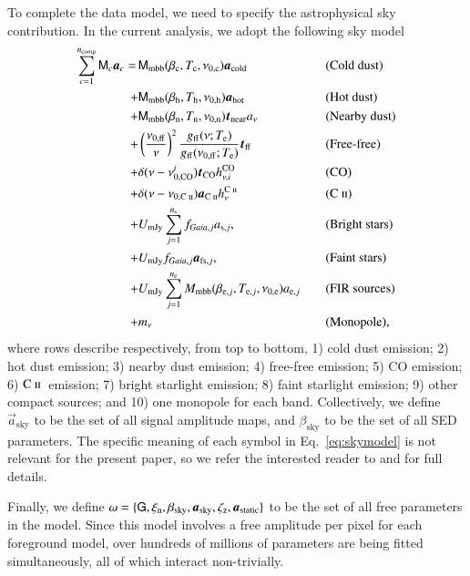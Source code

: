 \documentclass{aa}
\newcommand{\cii}{\ensuremath{\mathsc {C\ ii}}}
\renewcommand{\t}[0]{\vec{t}}
\newcommand{\G}[0]{\tens{G}}
\renewcommand{\a}[0]{\vec{a}}
\newcommand{\M}[0]{\tens{M}}
\newcommand{\Te}[0]{T_{\rm e}}
\newcommand{\mathsc}[1]{{\normalfont\textsc{#1}}}
\def\Tcold{\ifmmode T_\mathrm{c}\else $T_{\mathrm{c}}$\fi}
\def\Thot{\ifmmode T_\mathrm{h}\else $T_{\mathrm{h}}$\fi}
\def\Tnear{\ifmmode T_\mathrm{n}\else $T_{\mathrm{n}}$\fi}
\def\bcold{\ifmmode \beta_\mathrm{c}\else $\beta_{\mathrm{c}}$\fi}
\def\bhot{\ifmmode \beta_\mathrm{h}\else $\beta_{\mathrm{h}}$\fi}
\def\bnear{\ifmmode \beta_\mathrm{n}\else $\beta_{\mathrm{n}}$\fi}
\def\nuzeroff{\ifmmode \nu_{0,\mathrm{ff}}\else $\nu_{0,\mathrm{ff}}$\fi}
\def\nuzerocold{\ifmmode \nu_{0,\mathrm{c}}\else $\nu_{0,\mathrm{c}}$\fi}
\def\nuzerohot{\ifmmode \nu_{0,\mathrm{h}}\else $\nu_{0,\mathrm{h}}$\fi}
\def\nuzeronear{\ifmmode \nu_{0,\mathrm{n}}\else $\nu_{0,\mathrm{n}}$\fi}
\def\Te{\ifmmode T_{\mathrm{e}}\else $T_{\mathrm{e}}$\fi}
\begin{document}
To complete the data model, we need to specify the astrophysical sky
contribution. In the current analysis, we adopt the following sky model
\begin{alignat}{4}
  \sum_{c=1}^{n_{\mathrm{comp}}} \M_c \a_c  = \,
  &\M_{\mathrm{mbb}}(\bcold,\Tcold,\nuzerocold)\vec{a}_{\mathrm{cold}}
  && \textrm{(Cold dust)}\label{eq:skymodel}\\
  + &\M_{\mathrm{mbb}}(\bhot,\Thot,\nuzerohot)
  \vec{a}_{\mathrm{hot}} && \textrm{(Hot dust)}\nonumber \\
  + &\M_{\mathrm{mbb}}(\bnear,\Tnear,\nuzeronear) \t_{\mathrm{near}}
  a_{\nu} && \textrm{(Nearby dust)} \nonumber \\
  + &\left(\frac{\nuzeroff}{\nu}\right)^2
  \frac{g_{\mathrm{ff}}(\nu;\Te) }{g_{\mathrm{ff}}(\nuzeroff;\Te)}
  \vec{t}_{\mathrm{ff}} && \textrm{(Free-free)} \nonumber\\
  + &\delta(\nu-\nu_{0,\mathrm{CO}}^i) \t_{\mathrm{CO}}
  h^{\mathrm{CO}}_{\nu,i} && \textrm{(CO)}\nonumber\\
  + &\delta(\nu-\nu_{0,\cii}) \a_{\cii}
	h^{\cii}_{\nu} && (\cii)\nonumber \\
  + &U_{\mathrm{mJy}} \sum_{j=1}^{n_{\mathrm{s}}}
  f_{\mathit{Gaia},j} a_{\mathrm{s},j}, &\quad&
  \textrm{(Bright stars)} \nonumber\\
  + &U_{\mathrm{mJy}} f_{\mathit{Gaia},j} \a_{\mathrm{fs},j}, &\quad&
  \textrm{(Faint stars)} \nonumber\\  
    + &U_{\mathrm{mJy}} \sum_{j=1}^{n_{\mathrm{e}}}
  M_{\mathrm{mbb}}(\beta_{\mathrm{e},j},
  T_{\mathrm{e},j}, \nu_{0,\mathrm{e}})
  a_{\mathrm{e},j} && \textrm{(FIR sources)}\nonumber\\
  + &m_{\nu} && \textrm{(Monopole)}, \nonumber
\end{alignat}
where rows describe respectively, from top to bottom, 1) cold dust
emission; 2) hot dust emission; 3) nearby dust emission; 4) free-free
emission; 5) CO emission; 6) \cii\ emission; 7) bright starlight
emission; 8) faint starlight emission; 9) other compact sources; and
10) one monopole for each band. Collectively, we define
$\a_{\mathrm{sky}}$ to be the set of all signal amplitude maps, and
$\beta_{\mathrm{sky}}$ to be the set of all SED parameters. The
specific meaning of each symbol in Eq.~\eqref{eq:skymodel} is not
relevant for the present paper, so we
refer the interested reader to \citet{CG02_04} and \citet{CG02_05} for
full details.


Finally, we define $\omega = \{\G,\xi_{\mathrm{n}},
\beta_{\mathrm{sky}},\a_{\mathrm{sky}},\zeta_{\mathrm{z}},\a_{\mathrm{static}}\}$
to be the set of all free parameters in the model. Since this model involves
a free amplitude per pixel for each foreground model, over
hundreds of millions of parameters are being fitted simultaneously,
all of which interact non-trivially.
\end{document}
